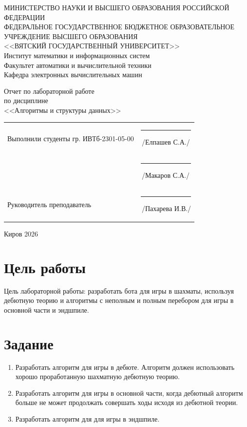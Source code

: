 \documentclass[a4paper,14pt]{extarticle}
\begin{document}
\newpage\thispagestyle{empty}
\begin{center}
    \MakeUppercase{
        Министерство науки и высшего образования Российской Федерации\\
        Федеральное государственное бюджетное образовательное учреждение высшего образования\\
        <<Вятский Государственный Университет>>\\
    }
    Институт математики и информационных систем\\
    Факультет автоматики и вычислительной техники\\
    Кафедра электронных вычислительных машин
\end{center}
\vfill

\begin{center}
    Отчет по лабораторной работе\\
    по дисциплине\\
    <<Алгоритмы и структуры данных>>\\
\end{center}
\vfill

\noindent
\begin{tabular}{ll}
    Выполнили студенты гр. ИВТб-2301-05-00 \hspace{5mm} & \rule[-1mm]{25mm}{0.10mm}\,/Елпашев С.А./  \\
                                                        & \rule[-1mm]{25mm}{0.10mm}\,/Макаров С.А./  \\
    Руководитель преподаватель                          & \rule[-1mm]{25mm}{0.10mm}\,/Пахарева И.В./ \\
\end{tabular}

\vfill
\begin{center}
    Киров 2026
\end{center}

\newpage
\section*{\hspace{12.5mm}Цель работы}
Цель лабораторной работы: разработать бота для игры в шахматы, используя дебютную теорию и алгоритмы с неполным и полным перебором для игры в основной части и эндшпиле.

\section*{\hspace{12.5mm}Задание}
\begin{enumerate}
    \item Разработать алгоритм для игры в дебюте. Алгоритм должен использовать хорошо проработанную шахматную дебютную теорию.
    \item Разработать алгоритм для игры в основной части, когда дебютный алгоритм больше не может продолжать совершать ходы исходя из дебютной теории.
    \item Разработать алгоритм для для игры в эндшпиле.
\end{enumerate}
\end{document}
